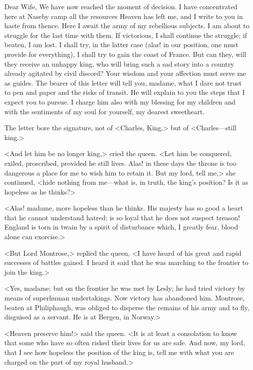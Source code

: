 \begin{mail}{}{Dear Wife,}
We have now reached the moment of decision. I have concentrated here at Naseby camp all the resources Heaven has left me, and I write to you in haste from thence. Here I await the army of my rebellious subjects. I am about to struggle for the last time with them. If victorious, I shall continue the struggle; if beaten, I am lost. I shall try, in the latter case (alas! in our position, one must provide for everything), I shall try to gain the coast of France. But can they, will they receive an unhappy king, who will bring such a sad story into a country already agitated by civil discord? Your wisdom and your affection must serve me as guides. The bearer of this letter will tell you, madame, what I dare not trust to pen and paper and the risks of transit. He will explain to you the steps that I expect you to pursue. I charge him also with my blessing for my children and with the sentiments of my soul for yourself, my dearest sweetheart.
\end{mail}

The letter bore the signature, not of <Charles, King,> but of <Charles—still king.>

<And let him be no longer king,> cried the queen. <Let him be conquered, exiled, proscribed, provided he still lives. Alas! in these days the throne is too dangerous a place for me to wish him to retain it. But my lord, tell me,> she continued, <hide nothing from me—what is, in truth, the king's position? Is it as hopeless as he thinks?>

<Alas! madame, more hopeless than he thinks. His majesty has so good a heart that he cannot understand hatred; is so loyal that he does not suspect treason! England is torn in twain by a spirit of disturbance which, I greatly fear, blood alone can exorcise.>

<But Lord Montrose,> replied the queen, <I have heard of his great and rapid successes of battles gained. I heard it said that he was marching to the frontier to join the king.>

<Yes, madame; but on the frontier he was met by Lesly; he had tried victory by means of superhuman undertakings. Now victory has abandoned him. Montrose, beaten at Philiphaugh, was obliged to disperse the remains of his army and to fly, disguised as a servant. He is at Bergen, in Norway.>

<Heaven preserve him!> said the queen. <It is at least a consolation to know that some who have so often risked their lives for us are safe. And now, my lord, that I see how hopeless the position of the king is, tell me with what you are charged on the part of my royal husband.>

